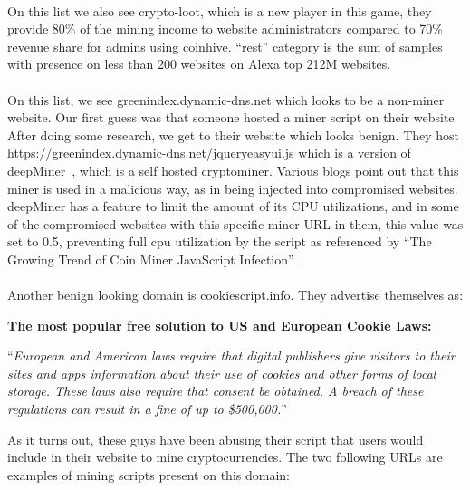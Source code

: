\documentclass[letterpaper]{scrartcl} %
\numberwithin{equation}{section} %
\numberwithin{figure}{section} %
\numberwithin{table}{section} %
\begin{document}
\paragraph{}
On this list we also see crypto-loot, which is a new player in this game, they provide 80\% of the mining income to website administrators compared to 70\% revenue share for admins using coinhive.
``rest'' category is the sum of samples with presence on less than 200 websites on Alexa top 212M websites.

\paragraph{}
On this list, we see greenindex.dynamic-dns.net which looks to be a non-miner website. Our first guess was that someone hosted a miner script on their website. After doing some research, we get to their website which looks benign. They host \href{https://greenindex.dynamic-dns.net/jqueryeasyui.js}{https://greenindex.dynamic-dns.net/jqueryeasyui.js} which is a version of deepMiner~\cite{ref:deepminer}, which is a self hosted cryptominer. Various blogs point out that this miner is used in a malicious way, as in being injected into compromised websites. deepMiner has a feature to limit the amount of its CPU utilizations, and in some of the compromised websites with this specific miner URL in them, this value was set to 0.5, preventing full cpu utilization by the script as referenced by ``The Growing Trend of Coin Miner JavaScript Infection''~\cite{ref:fortinet-minerinfection}.

\paragraph{}
Another benign looking domain is cookiescript.info. They advertise themselves as:

\textbf{The most popular free solution to US and European Cookie Laws:}

``\textit{European and American laws require that digital publishers give visitors to their sites and apps information about their use of cookies and other forms of local storage. These laws also require that consent be obtained. A breach of these regulations can result in a fine of up to \$500,000.}''

As it turns out, these guys have been abusing their script that users would include in their website to mine cryptocurrencies. The two following URLs are examples of mining scripts present on this domain:
\end{document}
